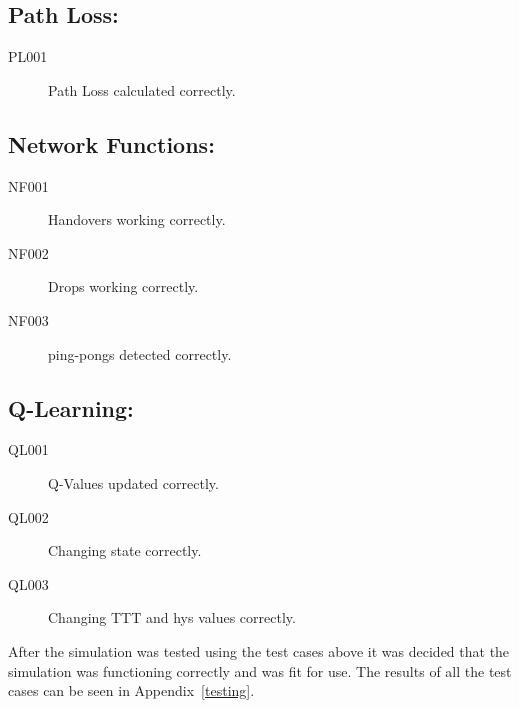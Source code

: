 \subsection*{Path Loss:}
\begin{description}
\item[PL001]	Path Loss calculated correctly.
\end{description}
\subsection*{Network Functions:}
\begin{description}
\item[NF001]	Handovers working correctly.
\item[NF002]	Drops working correctly.
\item[NF003]	ping-pongs detected correctly.
\end{description}
\subsection*{Q-Learning:}
\begin{description}
\item[QL001]	Q-Values updated correctly.
\item[QL002]	Changing state correctly.
\item[QL003]	Changing TTT and hys values correctly.
\end{description}
After the simulation was tested using the test cases above it was decided that the simulation was functioning correctly and was fit for use. The results of all the test cases can be seen in Appendix~\ref{testing}.
